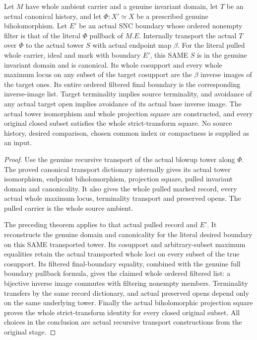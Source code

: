 \begin{theorem}
\label{hir:original-canonical-stage-reconstruction-base}
\leanok
Let $M$ have whole ambient carrier and a genuine invariant domain,
let $T$ be an actual canonical history, and let $\Phi:X'\simeq X$
be a prescribed genuine biholomorphism. Let $E'$ be an actual SNC
boundary whose ordered nonempty filter is that of the literal
$\Phi$ pullback of $M.E$. Internally transport the actual $T$ over
$\Phi$ to the actual tower $S$ with actual endpoint map $\beta$.
For the literal pulled whole carrier, ideal and mark with boundary
$E'$, this SAME $S$ is in the genuine invariant domain and is
canonical. Its whole cosupport and every whole maximum locus on any subset of
the target cosupport are the $\beta$ inverse images of the target ones. Its entire ordered
filtered final boundary is the corresponding inverse-image list.
Target terminality implies source terminality, and avoidance of any
actual target open implies avoidance of its actual base inverse
image. The actual tower isomorphism and whole projection square are
constructed, and every original closed subset satisfies the whole
strict-transform square. No source history, desired comparison,
chosen common index or compactness is supplied as an input.
\end{theorem}
\begin{proof}
Use the genuine recursive transport of the actual blowup tower along
$\Phi$. The proved canonical transport dictionary internally gives
its actual tower isomorphism, endpoint biholomorphism, projection
square, pulled invariant domain and canonicality. It also gives the
whole pulled marked record, every actual whole maximum locus,
terminality transport and preserved opens. The pulled carrier is
the whole source ambient.

The preceding theorem applies to that actual pulled record and
$E'$. It reconstructs the genuine domain and canonicality for the
literal desired boundary on this SAME transported tower. Its
cosupport and arbitrary-subset maximum equalities retain the actual
transported whole loci on every subset of the true cosupport. Its filtered final-boundary equality, combined
with the genuine full boundary pullback formula, gives the claimed
whole ordered filtered list: a bijective inverse image commutes with
filtering nonempty members. Terminality transfers by the same
record dictionary, and actual preserved opens depend only on the
same underlying tower. Finally the actual biholomorphic projection
square proves the whole strict-transform identity for every closed
original subset. All choices in the conclusion are actual recursive
transport constructions from the original stage.
\end{proof}
